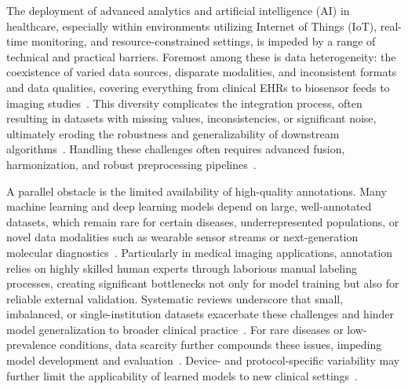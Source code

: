 \documentclass[sigconf]{acmart}
\begin{document}
The deployment of advanced analytics and artificial intelligence (AI) in healthcare, especially within environments utilizing Internet of Things (IoT), real-time monitoring, and resource-constrained settings, is impeded by a range of technical and practical barriers. Foremost among these is data heterogeneity: the coexistence of varied data sources, disparate modalities, and inconsistent formats and data qualities, covering everything from clinical EHRs to biosensor feeds to imaging studies~\cite{ref16,ref18,ref25,ref28,ref29,ref30,ref31,ref33,ref34,ref36,ref37,ref45,ref46,ref49,ref50,ref53,ref54,ref55,ref51,ref56,ref57,ref58,ref59,ref60,ref61,ref65,ref66,ref67,ref68,ref70,ref71,ref72,ref73,ref74,ref75,ref76,ref78,ref82,ref83,ref84,ref89,ref90,ref98,ref101,ref102,ref103,ref104,ref105,ref106,ref107}. This diversity complicates the integration process, often resulting in datasets with missing values, inconsistencies, or significant noise, ultimately eroding the robustness and generalizability of downstream algorithms~\cite{ref28,ref29,ref30,ref31,ref33,ref34,ref36,ref37,ref45,ref46,ref49,ref50,ref53,ref54,ref55,ref56,ref57,ref58,ref59,ref60,ref61,ref65,ref66,ref67,ref68,ref70,ref71,ref72,ref73,ref74,ref75,ref76,ref78,ref82,ref83,ref84,ref89,ref90,ref98,ref101,ref102,ref103,ref104,ref105,ref106,ref107}. Handling these challenges often requires advanced fusion, harmonization, and robust preprocessing pipelines~\cite{ref28,ref34,ref70,ref78}.

A parallel obstacle is the limited availability of high-quality annotations. Many machine learning and deep learning models depend on large, well-annotated datasets, which remain rare for certain diseases, underrepresented populations, or novel data modalities such as wearable sensor streams or next-generation molecular diagnostics~\cite{ref54,ref53,ref55,ref65,ref66}. Particularly in medical imaging applications, annotation relies on highly skilled human experts through laborious manual labeling processes, creating significant bottlenecks not only for model training but also for reliable external validation. Systematic reviews underscore that small, imbalanced, or single-institution datasets exacerbate these challenges and hinder model generalization to broader clinical practice~\cite{ref50,ref54}. For rare diseases or low-prevalence conditions, data scarcity further compounds these issues, impeding model development and evaluation~\cite{ref53,ref58,ref59,ref60,ref61}. Device- and protocol-specific variability may further limit the applicability of learned models to new clinical settings~\cite{ref54,ref58,ref66,ref67}.
\end{document}
